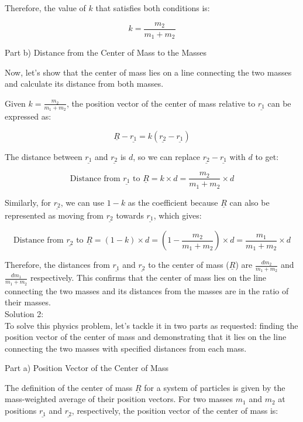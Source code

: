 \documentclass[a4paper,11pt]{article}
\begin{document}
Therefore, the value of \( k \) that satisfies both conditions is:

\[ k = \frac{m_2}{m_1 + m_2} \]

Part b) Distance from the Center of Mass to the Masses

Now, let's show that the center of mass lies on a line connecting the two masses and calculate its distance from both masses.

Given \( k = \frac{m_2}{m_1 + m_2} \), the position vector of the center of mass relative to \( \underline{r_{1}} \) can be expressed as:

\[ \underline{R} - \underline{r_{1}} = k(\underline{r_{2}} - \underline{r_{1}}) \]

The distance between \( \underline{r_{1}} \) and \( \underline{r_{2}} \) is \( d \), so we can replace \( \underline{r_{2}} - \underline{r_{1}} \) with \( d \) to get:

\[ \text{Distance from } \underline{r_{1}} \text{ to } \underline{R} = k \times d = \frac{m_2}{m_1 + m_2} \times d \]

Similarly, for \( \underline{r_{2}} \), we can use \( 1-k \) as the coefficient because \( \underline{R} \) can also be represented as moving from \( \underline{r_{2}} \) towards \( \underline{r_{1}} \), which gives:

\[ \text{Distance from } \underline{r_{2}} \text{ to } \underline{R} = (1-k) \times d = \left(1 - \frac{m_2}{m_1 + m_2}\right) \times d = \frac{m_1}{m_1 + m_2} \times d \]

Therefore, the distances from \( \underline{r_{1}} \) and \( \underline{r_{2}} \) to the center of mass (\( \underline{R} \)) are \( \frac{d m_2}{m_1 + m_2} \) and \( \frac{d m_1}{m_1 + m_2} \) respectively. This confirms that the center of mass lies on the line connecting the two masses and its distances from the masses are in the ratio of their masses. \\

\noindent Solution 2: \\

To solve this physics problem, let's tackle it in two parts as requested: finding the position vector of the center of mass and demonstrating that it lies on the line connecting the two masses with specified distances from each mass.

Part a) Position Vector of the Center of Mass

The definition of the center of mass \( \underline{R} \) for a system of particles is given by the mass-weighted average of their position vectors. For two masses \( m_1 \) and \( m_2 \) at positions \( \underline{r_{1}} \) and \( \underline{r_{2}} \), respectively, the position vector of the center of mass is:
\end{document}
